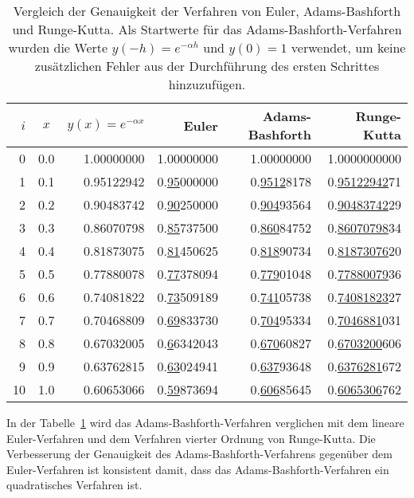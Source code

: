 \begin{table}
\centering
\begin{tabular}{|r|c|r|r|r|r|}
\hline
$i$& $x$ & $y(x)=e^{-\alpha x}$&Euler&Adams-Bashforth&Runge-Kutta\\
\hline
 0 & 0.0 & 1.00000000 & 1.00000000 & 1.00000000 & 1.0000000000 \\
 1 & 0.1 & 0.95122942 & 0.\underline{95}000000 & 0.\underline{9512}8178 & 0.\underline{95122942}71 \\
 2 & 0.2 & 0.90483742 & 0.\underline{90}250000 & 0.\underline{904}93564 & 0.\underline{90483742}29 \\
 3 & 0.3 & 0.86070798 & 0.\underline{85}737500 & 0.\underline{860}84752 & 0.\underline{86070798}34 \\
 4 & 0.4 & 0.81873075 & 0.\underline{81}450625 & 0.\underline{818}90734 & 0.\underline{81873076}20 \\
 5 & 0.5 & 0.77880078 & 0.\underline{77}378094 & 0.\underline{779}01048 & 0.\underline{77880079}36 \\
 6 & 0.6 & 0.74081822 & 0.\underline{73}509189 & 0.\underline{741}05738 & 0.\underline{74081823}27 \\
 7 & 0.7 & 0.70468809 & 0.\underline{69}833730 & 0.\underline{704}95334 & 0.\underline{7046881}031 \\
 8 & 0.8 & 0.67032005 & 0.\underline{6}6342043 & 0.\underline{670}60827 & 0.\underline{6703200}606 \\
 9 & 0.9 & 0.63762815 & 0.\underline{63}024941 & 0.\underline{637}93648 & 0.\underline{6376281}672 \\
10 & 1.0 & 0.60653066 & 0.\underline{59}873694 & 0.\underline{606}85645 & 0.\underline{6065306}762 \\
\hline
\end{tabular}
\caption{Vergleich der Genauigkeit der Verfahren von Euler,
Adams-Bashforth und Runge-Kutta.
Als Startwerte für das Adams-Bashforth-Verfahren wurden die
Werte $y(-h)=e^{-\alpha h}$ und $y(0)=1$ verwendet, um keine zusätzlichen
Fehler aus der Durchführung des ersten Schrittes hinzuzufügen.
\label{buch:ode:genauigkeit-adams-bashforth}}
\end{table}

In der Tabelle~\ref{buch:ode:genauigkeit-adams-bashforth} wird
das Adams-Bashforth-Verfahren verglichen mit dem lineare Euler-Verfah\-ren 
und dem Verfahren vierter Ordnung von Runge-Kutta.
Die Verbesserung der Genauigkeit des Adams-Bash\-forth-Verfahrens
gegenüber dem Euler-Ver\-fah\-ren ist konsistent damit, dass
das Adams-Bashforth-Verfahren ein quadratisches Verfahren ist.

